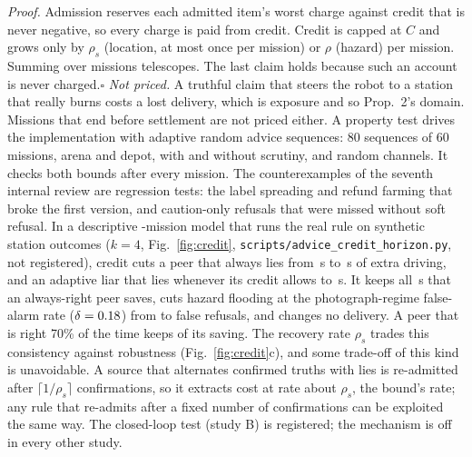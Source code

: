 \documentclass[conference]{IEEEtran}
\begin{document}
\emph{Proof.} Admission reserves each admitted item's worst charge against credit that is never negative, so every charge is paid from credit. Credit is capped at $C$ and grows only by $\rho_s$ (location, at most once per mission) or $\rho$ (hazard) per mission. Summing over missions telescopes. The last claim holds because such an account is never charged.\hfill$\square$
\emph{Not priced.} A truthful claim that steers the robot to a station that really burns costs a lost delivery, which is exposure and so Prop.~2's domain. Missions that end before settlement are not priced either.
A property test drives the implementation with adaptive random advice sequences: 80 sequences of 60 missions, arena and depot, with and without scrutiny, and random channels. It checks both bounds after every mission. The counterexamples of the seventh internal review are regression tests: the label spreading and refund farming that broke the first version, and caution-only refusals that were missed without soft refusal. In a descriptive \CrMissions-mission model that runs the real rule on synthetic station outcomes ($k=4$, Fig.~\ref{fig:credit}, \texttt{scripts/advice\_credit\_horizon.py}, not registered), credit cuts a peer that always lies from \CrLiarNo\,s to \CrLiarYes\,s of extra driving, and an adaptive liar that lies whenever its credit allows to \CrFarmYes\,s. It keeps all \CrHonest\,s that an always-right peer saves, cuts hazard flooding at the photograph-regime false-alarm rate ($\delta=0.18$) from \CrFloodNo{} to \CrFloodYes{} false refusals, and changes no delivery. A peer that is right 70\% of the time keeps \CrNoisyKeep{} of its saving. The recovery rate $\rho_s$ trades this consistency against robustness (Fig.~\ref{fig:credit}c), and some trade-off of this kind is unavoidable. A source that alternates confirmed truths with lies is re-admitted after $\lceil 1/\rho_s\rceil$ confirmations, so it extracts cost at rate about $\rho_s$, the bound's rate; any rule that re-admits after a fixed number of confirmations can be exploited the same way. The closed-loop test (study B) is registered; the mechanism is off in every other study.
\end{document}
